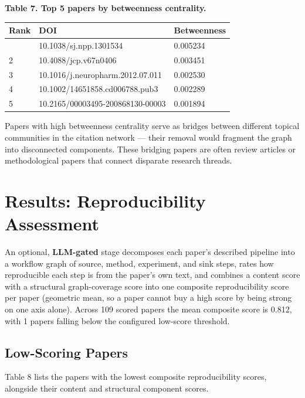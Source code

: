 \documentclass[
  english,
]{article}
\newcounter{none} %
\begin{document}
\textbf{Table 7. Top 5 papers by betweenness centrality.}

{\def\LTcaptype{none} %
\begin{longtable}[]{@{}lll@{}}
\toprule\noalign{}
Rank & DOI & Betweenness \\
\midrule\noalign{}
\endhead
\bottomrule\noalign{}
\endlastfoot
1 & 10.1038/sj.npp.1301534 & 0.005234 \\
2 & 10.4088/jcp.v67n0406 & 0.003451 \\
3 & 10.1016/j.neuropharm.2012.07.011 & 0.002530 \\
4 & 10.1002/14651858.cd006788.pub3 & 0.002289 \\
5 & 10.2165/00003495-200868130-00003 & 0.001894 \\
\end{longtable}
}

Papers with high betweenness centrality serve as bridges between
different topical communities in the citation network --- their removal
would fragment the graph into disconnected components. These bridging
papers are often review articles or methodological papers that connect
disparate research threads.

\newpage

\section{Results: Reproducibility
Assessment}\label{results-reproducibility-assessment}

An optional, \textbf{LLM-gated} stage decomposes each paper's described
pipeline into a workflow graph of source, method, experiment, and sink
steps, rates how reproducible each step is from the paper's own text,
and combines a content score with a structural graph-coverage score into
one composite reproducibility score per paper (geometric mean, so a
paper cannot buy a high score by being strong on one axis alone). Across
109 scored papers the mean composite score is 0.812, with 1 papers
falling below the configured low-score threshold.

\subsection{Low-Scoring Papers}\label{low-scoring-papers}

Table 8 lists the papers with the lowest composite reproducibility
scores, alongside their content and structural component scores.
\end{document}
